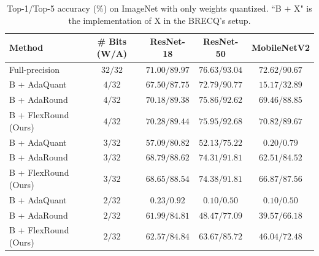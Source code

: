\documentclass{article}
\theoremstyle{plain}
\theoremstyle{definition}
\theoremstyle{remark}
\begin{document}
\begin{table}[t]
\vskip -0.1in
\caption{Top-1/Top-5 accuracy (\%) on ImageNet with only weights quantized. ``B $+$ X" is the implementation of X in the BRECQ's setup.} %
\label{tab:imagenet_w_brecq}
\begin{center}
\small
\begin{tabular}{lcccc}
\toprule
Method & \# Bits (W/A) & ResNet-18 & ResNet-50 & MobileNetV2 \\
\midrule
Full-precision & $32 / 32$ & $71.00 / 89.97$ & $76.63 / 93.04$ & $72.62 / 90.67$\\
\midrule
B + AdaQuant & $4 / 32$ & $67.50 / 87.75$ & $72.79 / 90.77$ & $15.17 / 32.89$  \\
B + AdaRound & $4 / 32$ & $70.18 / 89.38$ & $75.86 / 92.62$ & $69.46 / 88.85$ \\
B + FlexRound (Ours) & $4 / 32$ & $\mathbf{70.28} / \mathbf{89.44}$ & $\mathbf{75.95} / \mathbf{92.68}$ & $\mathbf{70.82} / \mathbf{89.67}$ \\ 
\midrule
B + AdaQuant & $3 / 32$ & $57.09 / 80.82$ & $52.13 / 75.22$ & $0.20 / 0.79$  \\
B + AdaRound & $3 / 32$ & $\mathbf{68.79} / \mathbf{88.62}$ & $74.31 / 91.81$ & $62.51 / 84.52$ \\
B + FlexRound (Ours)& $3 / 32$ & $68.65 / 88.54$ & $\mathbf{74.38} / \mathbf{91.81}$ & $\mathbf{66.87} / \mathbf{87.56}$ \\
\midrule
B + AdaQuant & $2 / 32$ & $0.23 / 0.92$ & $0.10 / 0.50$ & $0.10 / 0.50$  \\
B + AdaRound & $2 / 32$ & $61.99 / 84.81$ & $48.47 / 77.09$ & $39.57 / 66.18$ \\ %
B + FlexRound (Ours)& $2 / 32$ & $\mathbf{62.57} / \mathbf{84.84}$ & $\mathbf{63.67} / \mathbf{85.72}$ & $\mathbf{46.04} / \mathbf{72.48}$ \\
\bottomrule
\end{tabular}
\end{center}
\vskip -0.15in
\end{table}
\end{document}

